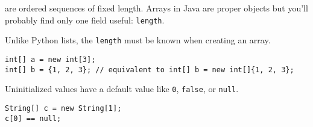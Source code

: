 \begin{blocksection}
 are ordered sequences of fixed length. Arrays in Java are
proper objects but you'll probably find only one field useful:
\lstinline$length$.

Unlike Python lists, the \lstinline$length$ must be known when creating an
array.

\begin{lstlisting}
int[] a = new int[3];
int[] b = {1, 2, 3}; // equivalent to int[] b = new int[]{1, 2, 3};
\end{lstlisting}

Uninitialized values have a default value like \lstinline$0$,
\lstinline$false$, or \lstinline$null$.

\begin{lstlisting}
String[] c = new String[1]; 
c[0] == null;
\end{lstlisting}
\end{blocksection}
